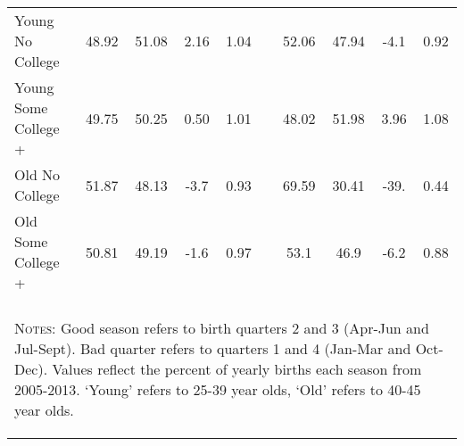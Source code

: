 \begin{table}[htpb!]
\begin{center}
{\begin{tabular}{lccccp{6mm}cccc}
Young No College&48.92&51.08&2.16&1.04
&&52.06&47.94&-4.1&0.92
\\ 
Young Some College +&49.75&50.25&0.50&1.01
&&48.02&51.98&3.96&1.08
\\ 
Old No College&51.87&48.13&-3.7&0.93
&&69.59&30.41&-39.&0.44
\\ 
Old Some College +&50.81&49.19&-1.6&0.97
&&53.1&46.9&-6.2&0.88
\\ 
 &&&&&&&&& \\
\midrule\multicolumn{10}{p{15.0cm}}{\begin{footnotesize}\textsc{Notes:} Good season refers to birth quarters 2 and 3 (Apr-Jun and Jul-Sept).  Bad quarter refers to quarters 1 and 4 (Jan-Mar and Oct-Dec).  Values reflect the percent of yearly births each season from 2005-2013. `Young' refers to 25-39 year olds, `Old' refers to 40-45 year olds. 
\end{footnotesize}} \\ \bottomrule 
 \end{tabular}}\end{center}\end{table}

